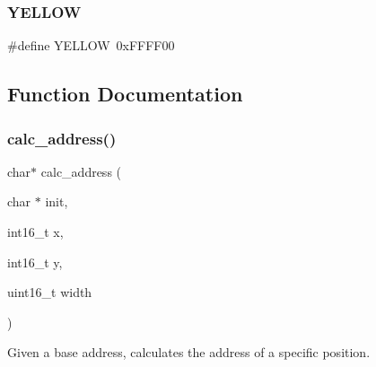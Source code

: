 \mbox{\label{group__video_gabf681265909adf3d3e8116c93c0ba179}} 
\subsubsection{\texorpdfstring{Y\+E\+L\+L\+OW}{YELLOW}}
{\footnotesize\ttfamily \#define Y\+E\+L\+L\+OW~0x\+F\+F\+F\+F00}



\subsection{Function Documentation}
\mbox{\label{group__video_ga57014a19e5d9cf805bcf7af1f6bbcec5}} 
\subsubsection{\texorpdfstring{calc\+\_\+address()}{calc\_address()}}
{\footnotesize\ttfamily char$\ast$ calc\+\_\+address (\begin{DoxyParamCaption}\item[{char $\ast$}]{init,  }\item[{int16\+\_\+t}]{x,  }\item[{int16\+\_\+t}]{y,  }\item[{uint16\+\_\+t}]{width }\end{DoxyParamCaption})}



Given a base address, calculates the address of a specific position. 


